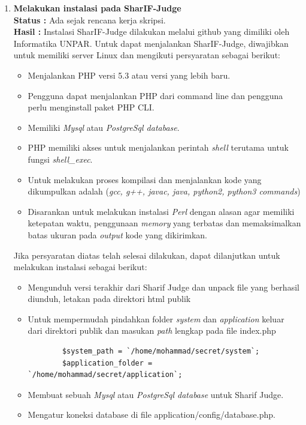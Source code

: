 \documentclass[a4paper,twoside]{article}
\begin{document}
	\begin{enumerate}
        \item \textbf{Melakukan instalasi pada SharIF-Judge}\\
		{\bf Status :} Ada sejak rencana kerja skripsi.\\
		{\bf Hasil :} Instalasi SharIF-Judge dilakukan melalui github yang dimiliki oleh Informatika UNPAR. Untuk dapat menjalankan SharIF-Judge, diwajibkan untuk memiliki server Linux dan mengikuti persyaratan sebagai berikut:
\begin{itemize}
    \item Menjalankan PHP versi 5.3 atau versi yang lebih baru.
    \item Pengguna dapat menjalankan PHP dari command line  dan pengguna perlu menginstall paket PHP CLI.
    \item Memiliki \textit{Mysql} atau \textit{PostgreSql database}.
    \item PHP memiliki akses untuk menjalankan perintah \textit{shell} terutama untuk fungsi \textit{shell\_exec}.
    \item Untuk melakukan proses kompilasi dan menjalankan kode yang dikumpulkan adalah (\textit{gcc, g++, javac, java, python2, python3 commands})
    \item Disarankan untuk melakukan instalasi \textit{Perl} dengan alasan agar memiliki ketepatan waktu, penggunaan \textit{memory} yang terbatas dan memaksimalkan batas ukuran pada \textit{output} kode yang dikirimkan.
\end{itemize}
Jika persyaratan diatas telah selesai dilakukan, dapat dilanjutkan untuk melakukan instalasi sebagai berikut: 
\begin{itemize}
    \item Mengunduh versi terakhir dari Sharif Judge dan unpack file yang berhasil diunduh, letakan pada direktori html publik
    \item Untuk mempermudah pindahkan folder \textit{system}  dan \textit{application} keluar dari direktori publik dan masukan \textit{path} lengkap pada file index.php

\begin{verbatim}
        $system_path = `/home/mohammad/secret/system`;
        $application_folder = `/home/mohammad/secret/application`;
\end{verbatim} 
    \item Membuat sebuah \textit{Mysql} atau \textit{PostgreSql database} untuk Sharif Judge.
    \item Mengatur koneksi database di file application/config/database.php.


\end{itemize}
\end{enumerate}
\end{document}
